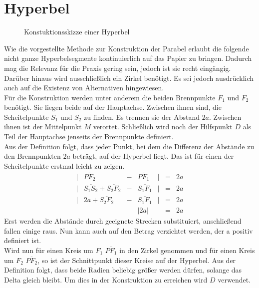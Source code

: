 \section{Hyperbel}
\begin{figure}[h]
	\centering
		\resizebox{.5\linewidth}{!}{
			
		}
	\caption{Konstuktionsskizze einer Hyperbel}
\end{figure}
Wie die vorgestellte Methode zur Konstruktion der Parabel erlaubt die folgende \cite[S.150]{Malle:2011} nicht ganze Hyperbelsegmente kontinuierlich auf das Papier zu bringen. Dadurch mag die Relevanz für die Praxis gering sein, jedoch ist sie recht eingängig. Darüber hinaus wird ausschließlich ein Zirkel benötigt. Es sei jedoch ausdrücklich auch auf die Existenz von Alternativen hingewiesen.\\
Für die Konstruktion werden unter anderem die beiden Brennpunkte ${F}_1$ und ${F}_2$ benötigt. Sie liegen beide auf der Hauptachse. Zwischen ihnen sind, die Scheitelpunkte ${S}_1$ und ${S}_2$ zu finden. Es trennen sie der Abstand $2a$. Zwischen ihnen ist der Mittelpunkt $M$ verortet. Schließlich wird noch der Hilfspunkt $D$ als Teil der Hauptachse jenseits der Brennpunkte definiert.\\
Aus der Definition folgt, dass jeder Punkt, bei dem die Differenz der Abstände zu den Brennpunkten $2a$ beträgt, auf der Hyperbel liegt. Das ist für einen der Scheitelpunkte erstmal leicht zu zeigen.
\begin{displaymath}
	\begin{array}{lcccrcl}
		|&\overline{{PF}_2} & - & \overline{{PF}_1}&| & = & 2a\\
		|&\overline{{S}_1{S}_2}+\overline{{S}_2{F}_2} & - & \overline{{S}_1{F}_1}&| & = & 2a\\
		|&2a+\overline{{S}_2{F}_2} & - & \overline{{S}_1{F}_1}&| & = & 2a\\
		&&&|2a| && = & 2a
	\end{array}
\end{displaymath}
Erst werden die Abstände durch geeignete Strecken substituiert, anschließend fallen einige raus. Nun kann auch auf den Betrag verzichtet werden, der a positiv definiert ist.\\
Wird nun für einen Kreis um ${F}_1$ $\overline{{PF}_1}$ in den Zirkel genommen und für einen Kreis um ${F}_2$ $\overline{{PF}_2}$, so ist der Schnittpunkt dieser Kreise auf der Hyperbel. Aus der Definition folgt, dass beide Radien beliebig größer werden dürfen, solange das Delta gleich bleibt. Um dies in der Konstruktion zu erreichen wird $D$ verwendet.
